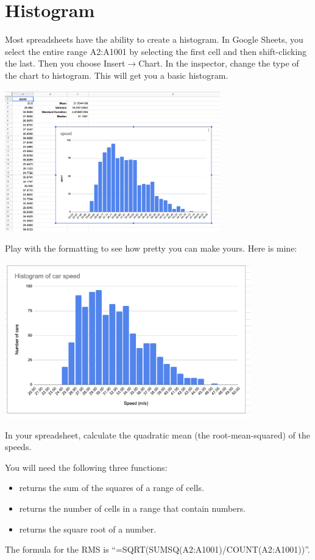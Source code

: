\section{Histogram}

Most spreadsheets have the ability to create a histogram.  In Google
Sheets, you select the entire range A2:A1001 by selecting the first
cell and then shift-clicking the last. Then you choose
Insert$\rightarrow$Chart. In the inspector, change the type of the
chart to histogram. This will get you a basic histogram.

\includegraphics[width=0.7\textwidth]{default_histogram.png}

Play with the formatting to see how pretty you can make yours.  Here is mine:

\includegraphics[width=0.8\textwidth]{final_histogram.png}

\begin{Exercise}[title={RMS}, label=rms_spreadsheet]

  In your spreadsheet, calculate the quadratic mean (the root-mean-squared) of the speeds.

  You will need the following three functions:
  \begin{itemize}
  \item {} returns the sum of the squares of a range of cells.
  \item {} returns the number of cells in a range that contain numbers.
  \item {} returns the square root of a number.
  \end{itemize}


\end{Exercise}
\begin{Answer}[ref=rms_spreadsheet]

The formula for the RMS is ``=SQRT(SUMSQ(A2:A1001)/COUNT(A2:A1001))''.
  
\end{Answer}
